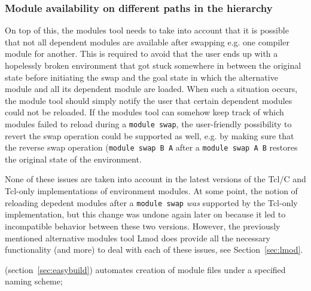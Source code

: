 \subsubsection{Module availability on different paths in the hierarchy}
On top of this, the modules tool needs to take into account that it is
possible that not all dependent modules are available after swapping e.g.
one compiler module for another. This is required to avoid that the user
ends up with a hopelessly broken environment that got stuck somewhere in
between the original state before initiating the swap and the goal state
in which the alternative module and all its dependent module are loaded.
When such a situation occurs, the module tool should simply notify the user
that certain dependent modules could not be reloaded. If the modules tool
can somehow keep track of which modules failed to reload during a
\texttt{module swap}, the user-friendly possibility to revert the swap
operation could be supported as well, e.g. by making sure that the reverse
swap operation (\texttt{module swap B A} after a \texttt{module swap A B}
restores the original state of the environment.



None of these issues are taken into account in the latest versions of the
Tcl/C and Tcl-only implementations of environment modules. At some point,
the notion of reloading depedent modules after a \texttt{module swap}
\emph{was} supported by the Tcl-only implementation, but this change was
undone again later on because it led to incompatible behavior between
these two versions.
However, the previously mentioned alternative modules tool Lmod does
provide all the necessary functionality (and more) to deal with each of
these issues, see Section~\ref{sec:lmod}.


\easybuild{} (section~\ref{sec:easybuild}) automates creation of module files under a specified naming scheme;
